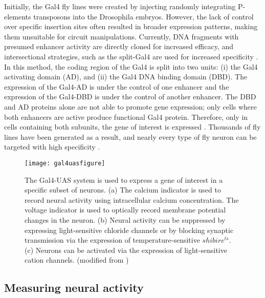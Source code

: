Initially, the Gal4 fly lines were created by injecting randomly integrating P-elements transposons into the Drosophila embryos. However, the lack of control over specific insertion sites often resulted in broader expression patterns, making them unsuitable for circuit manipulations. Currently, DNA fragments with presumed enhancer activity are directly cloned for increased efficacy, and intersectional strategies, such as the split-Gal4 are used for increased specificity \parencite{Pfeiffer2008, Jenett2012}. In this method, the coding region of the Gal4 is split into two units: (i) the Gal4 activating domain (AD), and (ii) the Gal4 DNA binding domain (DBD). The expression of the Gal4-AD is under the control of one enhancer and the expression of the Gal4-DBD is under the control of another enhancer. The DBD and AD proteins alone are not able to promote gene expression; only cells where both enhancers are active produce functional Gal4 protein. Therefore, only in cells containing both subunits, the gene of interest is expressed \parencite{Luan2006}. Thousands of fly lines have been generated as a result, and nearly every type of fly neuron can be targeted with high specificity \parencite{Pfeiffer2010}.
\begin{figure}
\centering
\hspace*{-1cm} 
\texttt{[image: gal4uasfigure]}
\caption[Genetic tools for functional manipulations in \textit{Drosophila}] {The Gal4-UAS system is used to express a gene of interest in a specific subset of neurons. (a) The calcium indicator is used to record neural activity using intracellular calcium concentration. The voltage indicator is used to optically record membrane potential changes in the neuron. (b) Neural activity can be suppressed by expressing light-sensitive chloride channels or by blocking synaptic transmission via the expression of temperature-sensitive $shibire^{ts}$. (c) Neurons can be activated via the expression of light-sensitive cation channels. (modified from \cite{Borst2009})}
\label{fig:gal4uas}
\end{figure}

\subsection{Measuring neural activity}

